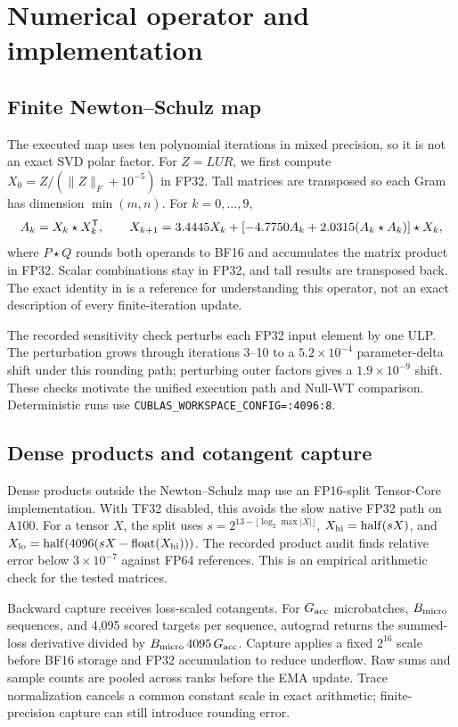 \section{Numerical operator and implementation}
\label{app:appendix_math}

\subsection{Finite Newton--Schulz map}

The executed map uses ten polynomial iterations in mixed precision, so it is not an exact SVD polar factor. For $Z=LUR$, we first compute $X_0=Z/(\|Z\|_F+10^{-5})$ in FP32. Tall matrices are transposed so each Gram has dimension $\min(m,n)$. For $k=0,\ldots,9$,
\begin{equation}
 A_k=X_k\star X_k^{{\mathsf{T}}},\qquad
 X_{k+1}=3.4445X_k+[-4.7750A_k+2.0315(A_k\star A_k)]\star X_k,
 \label{eq:ns10}
\end{equation}
where $P\star Q$ rounds both operands to BF16 and accumulates the matrix product in FP32. Scalar combinations stay in FP32, and tall results are transposed back. The exact identity in  is a reference for understanding this operator, not an exact description of every finite-iteration update.

The recorded sensitivity check perturbs each FP32 input element by one ULP. The perturbation grows through iterations 3--10 to a $5.2\times10^{-4}$ parameter-delta shift under this rounding path; perturbing outer factors gives a $1.9\times10^{-9}$ shift. These checks motivate the unified execution path and Null-WT comparison. Deterministic runs use \texttt{CUBLAS\_WORKSPACE\_CONFIG=:4096:8}.

\subsection{Dense products and cotangent capture}

Dense products outside the Newton--Schulz map use an FP16-split Tensor-Core implementation. With TF32 disabled, this avoids the slow native FP32 path on A100. For a tensor $X$, the split uses $s=2^{13-\lfloor\log_2\max|X|\rfloor}$, $X_{\rm hi}=\operatorname{half}(sX)$, and $X_{\rm lo}=\operatorname{half}(4096(sX-\operatorname{float}(X_{\rm hi})))$. The recorded product audit finds relative error below $3\times10^{-7}$ against FP64 references. This is an empirical arithmetic check for the tested matrices.

Backward capture receives loss-scaled cotangents. For $G_{\rm acc}$ microbatches, $B_{\rm micro}$ sequences, and 4,095 scored targets per sequence, autograd returns the summed-loss derivative divided by $B_{\rm micro}\,4095\,G_{\rm acc}$. Capture applies a fixed $2^{16}$ scale before BF16 storage and FP32 accumulation to reduce underflow. Raw sums and sample counts are pooled across ranks before the EMA update. Trace normalization cancels a common constant scale in exact arithmetic; finite-precision capture can still introduce rounding error.


